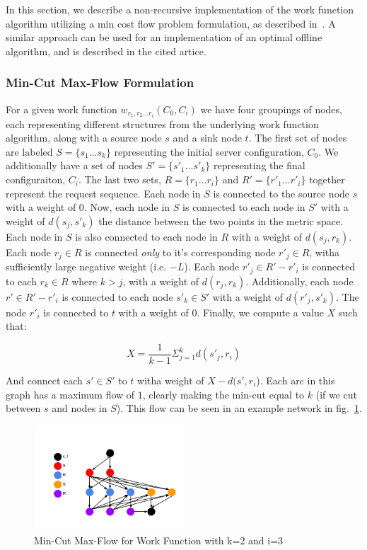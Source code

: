 In this section, we describe a non-recursive implementation of the work function algorithm utilizing a min cost flow problem formulation, as described in~\cite{mcfp2011}. A similar approach can be used for an implementation of an optimal offline algorithm, and is described in the cited artice.

\subsubsection*{Min-Cut Max-Flow Formulation}
For a given work function $w_{r_1, r_2...r_i}(C_0, C_i)$ we have four groupings of nodes, each representing different structures from the underlying work function algorithm, along with a source node $s$ and a sink node $t$. The first set of nodes are labeled $S = \{s_1 ... s_k\}$ representing the initial server configuration, $C_0$. We additionally have a set of nodes $S' = \{s'_1 ... s'_k\}$ representing the final configuraiton, $C_i$. The last two sets, $R = \{r_1 ... r_i\}$ and $R' = \{r'_1 ... r'_i\}$ together represent the request sequence. Each node in $S$ is connected to the source node $s$ with a weight of $0$. Now, each node in $S$ is connected to each node in $S'$ with a weight of $d(s_j, s'_k)$ the distance between the two points in the metric space. Each node in $S$ is also connected to each node in $R$ with a weight of $d(s_j, r_k)$. Each node $r_j \in R$ is connected \textit{only} to it's corresponding node $r'_j\in R$, witha sufficiently large negative weight (i.e. $-L$). Each node $r'_j \in R' - r'_i$ is connected to each $r_k \in R$ where $k > j$, with a weight of $d(r_j, r_k)$. Additionally, each node $r' \in R'-r'_i$ is connected to each node $s'_k \in S'$ with a weight of $d(r'_j, s'_k)$. The node $r'_i$ is connected to $t$ with a weight of $0$. Finally, we compute a value $X$ such that:

\begin{equation*}
    X = \frac{1}{k-1} \Sigma_{j=1}^{k} d(s'_j, r_i)
\end{equation*}

And connect each $s' \in S'$ to $t$ witha weight of $X-d(s', r_i$). Each arc in this graph has a maximum flow of $1$, clearly making the min-cut equal to $k$ (if we cut between $s$ and nodes in $S$). This flow can be seen in an example network in fig.~\ref{fig:mcfp}.

\begin{figure}[h]
    \centering
    \includegraphics[width=0.5\textwidth]{images/mcfp.png}
    \caption{Min-Cut Max-Flow for Work Function with k=2 and i=3}
    \label{fig:mcfp}
\end{figure}

